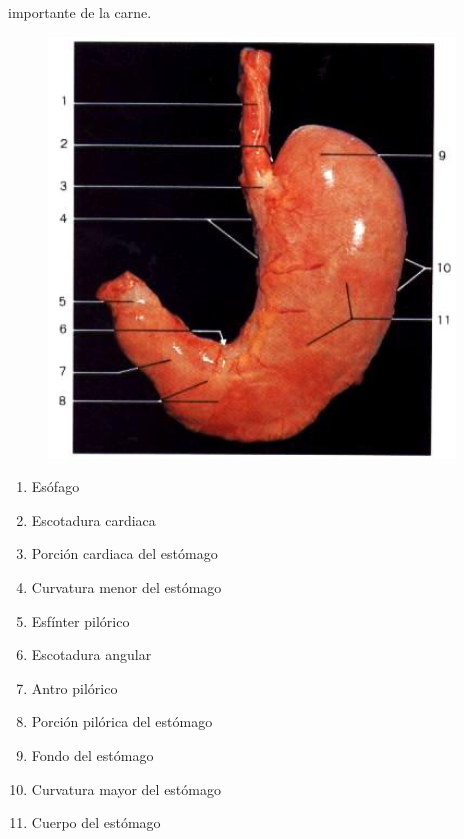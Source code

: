 importante de la carne.\\
\begin{figure}[H]
	\begin{center}
 		\includegraphics[width = .7\textwidth]{v2/images/image2.png}
	\end{center} 
\end{figure}
\begin{enumerate}
    \item Esófago
    \item Escotadura cardiaca
    \item Porción cardiaca del estómago
    \item Curvatura menor del estómago
    \item Esfínter pilórico
    \item Escotadura angular
    \item Antro pilórico
    \item Porción pilórica del estómago
    \item Fondo del estómago
    \item Curvatura mayor del estómago 
    \item Cuerpo del estómago    
\end{enumerate}

